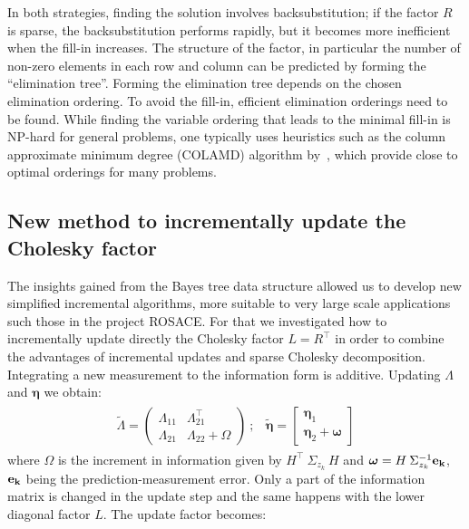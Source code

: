 \documentclass{article}
\newcommand{\inv}{^{-1}}
\newcommand{\tr}{^{\!\top}}
\begin{document}
{In both strategies, finding the solution involves backsubstitution; if the factor $R$ is sparse, the backsubstitution performs rapidly, but it becomes more inefficient when the fill-in increases. The structure of the factor, in particular the number of non-zero elements in each row and column can be predicted by forming the ``elimination tree''. Forming the elimination tree depends on the chosen elimination ordering. To avoid the fill-in, efficient elimination orderings need to be found. While finding the variable ordering that leads to the minimal fill-in is NP-hard \cite{Arnborg87siam} for general problems, one typically uses heuristics such as the column approximate minimum degree (COLAMD) algorithm by~\cite{Davis04acm}, which provide close to optimal orderings for many problems.

\subsection{New method to incrementally update the Cholesky factor}\label{subsec:LSLAM}
The insights gained from the Bayes tree data structure allowed us to develop new simplified incremental algorithms, more suitable to very large scale applications such those in the project ROSACE.
For that we investigated how to incrementally update directly the Cholesky factor $L=R\tr$ in order to combine the advantages of incremental updates and  sparse Cholesky decomposition. 
\\
Integrating a new measurement to the information form is additive. Updating $\Lambda$ and $ {\boldsymbol \eta}$ we obtain:
\begin{eqnarray}
\begin{array}{cc} 
\tilde \Lambda= \left (\begin{array}{cc} 
 \Lambda_{11} & \Lambda_{21}\tr \\
 \Lambda_{21} &  \Lambda_{22}+\Omega
\end{array} \right )\:; & \tilde {\boldsymbol \eta}=\left[\begin{array}{c} {\boldsymbol \eta}_{1}\\ {\boldsymbol \eta}_{2}+{\boldsymbol \omega}\end{array}\right]
\end{array}
\label{eq:updateLambda}
\end{eqnarray}
where $\Omega$ is the increment in information given by $H\tr\:\Sigma_{z_k}\:H$ and ${\boldsymbol \omega}= H\:\Sigma_{z_k}\inv {\bf e_k}$, ${\bf e_k}$ being the prediction-measurement error. Only a part of the information matrix is changed in the update step and the same happens with the lower diagonal factor $L$. The update factor becomes:
}
\end{document}
